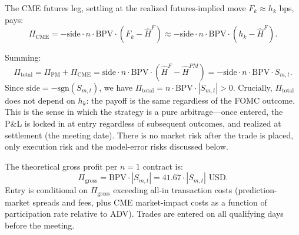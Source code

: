 The CME futures leg, settling at the realized futures-implied move $F_k \approx h_k$ bps, pays:
\[
\Pi_\text{CME} = -\text{side} \cdot n \cdot \text{BPV} \cdot (F_k - \widehat{H}^{F}) \approx -\text{side} \cdot n \cdot \text{BPV} \cdot (h_k - \widehat{H}^{F}).
\]

Summing:
\[
\Pi_\text{total} = \Pi_\text{PM} + \Pi_\text{CME} = \text{side} \cdot n \cdot \text{BPV} \cdot (\widehat{H}^{F} - \widehat{H}^{PM}) = -\text{side} \cdot n \cdot \text{BPV} \cdot S_{m,t}.
\]
Since $\text{side} = -\text{sgn}(S_{m,t})$, we have $\Pi_\text{total} = n \cdot \text{BPV} \cdot |S_{m,t}| > 0$. Crucially, $\Pi_\text{total}$ does not depend on $h_k$: the payoff is the same regardless of the FOMC outcome. This is the sense in which the strategy is a pure arbitrage---once entered, the P\&L is locked in at entry regardless of subsequent outcomes, and realized at settlement (the meeting date). There is no market risk after the trade is placed, only execution risk and the model-error risks discussed below.

The theoretical gross profit per $n=1$ contract is:
\[
\Pi_\text{gross} = \text{BPV} \cdot |S_{m,t}| = 41.67 \cdot |S_{m,t}| \text{ USD}.
\]
Entry is conditional on $\Pi_\text{gross}$ exceeding all-in transaction costs (prediction-market spreads and fees, plus CME market-impact costs as a function of participation rate relative to ADV). Trades are entered on all qualifying days before the meeting.

